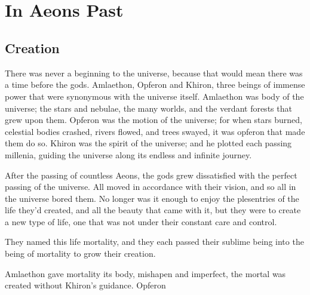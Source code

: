 \documentclass[12pt, a4paper]{book}
\begin{document}
\part*{
\setlength{\fboxsep}{3pt}%
\setlength{\fboxrule}{3pt}%
~\\[1cm]
In Aeons Past
}
\setcounter{chapter}{0}

\chapter{Creation}
There was never a beginning to the universe, because that would mean there was a time before the gods. Amlaethon, Opferon and Khiron, three beings of immense power that were synonymous with the universe itself. Amlaethon was body of the universe; the stars and nebulae, the many worlds, and the verdant forests that grew upon them. Opferon was the motion of the universe; for when stars burned, celestial bodies crashed, rivers flowed, and trees swayed, it was opferon that made them do so. Khiron was the spirit of the universe; and he plotted each passing millenia, guiding the universe along its endless and infinite journey.

After the passing of countless Aeons, the gods grew dissatisfied with the perfect passing of the universe. All moved in accordance with their vision, and so all in the universe bored them. No longer was it enough to enjoy the plesentries of the life they'd created, and all the beauty that came with it, but they were to create a new type of life, one that was not under their constant care and control.

They named this life mortality, and they each passed their sublime being into the being of mortality to grow their creation.

Amlaethon gave mortality its body, mishapen and imperfect, the mortal was created without Khiron's guidance. Opferon 
\end{document}
